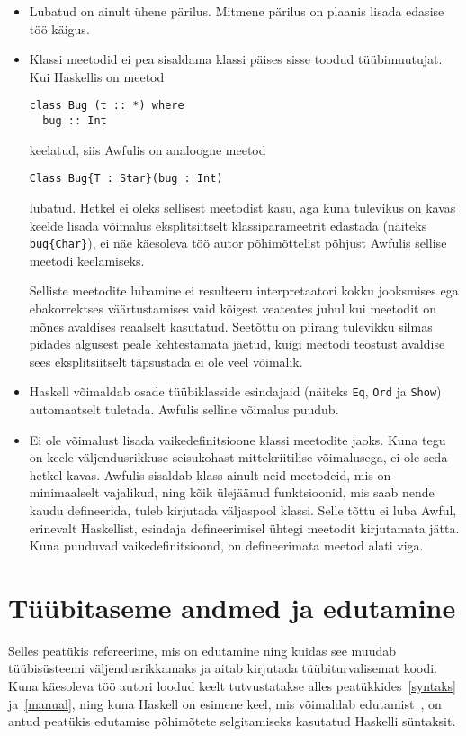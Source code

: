 \documentclass[12pt]{article}
\newcommand\peatykk[1]{
  \clearpage
  \section{#1}}
\begin{document}
      \begin{itemize}
        \item
          Lubatud on ainult ühene pärilus. Mitmene pärilus on plaanis lisada edasise töö käigus.
        \item
          Klassi meetodid ei pea sisaldama klassi päises sisse toodud tüübimuutujat. Kui Haskellis on meetod

          \begin{verbatim}class Bug (t :: *) where
  bug :: Int\end{verbatim}

          keelatud, siis Awfulis on analoogne meetod

          \begin{verbatim}Class Bug{T : Star}(bug : Int)\end{verbatim}

          lubatud. Hetkel ei oleks sellisest meetodist kasu, aga kuna tulevikus on kavas keelde lisada võimalus eksplitsiitselt klassiparameetrit edastada (näiteks \verb!bug{Char}!), ei näe käesoleva töö autor põhimõttelist põhjust Awfulis sellise meetodi keelamiseks.

          Selliste meetodite lubamine ei resulteeru interpretaatori kokku jooksmises ega ebakorrektses väärtustamises vaid kõigest veateates juhul kui meetodit on mõnes avaldises reaalselt kasutatud. Seetõttu on piirang tulevikku silmas pidades algusest peale kehtestamata jäetud, kuigi meetodi teostust avaldise sees eksplitsiitselt täpsustada ei ole veel võimalik.
        \item
          Haskell võimaldab osade tüübiklasside esindajaid (näiteks \verb!Eq!, \verb!Ord! ja \verb!Show!) automaatselt tuletada. Awfulis selline võimalus puudub.
        \item
          Ei ole võimalust lisada vaikedefinitsioone klassi meetodite jaoks. Kuna tegu on keele väljendusrikkuse seisukohast mittekriitilise võimalusega, ei ole seda hetkel kavas. Awfulis sisaldab klass ainult neid meetodeid, mis on minimaalselt vajalikud, ning kõik ülejäänud funktsioonid, mis saab nende kaudu defineerida, tuleb kirjutada väljaspool klassi. Selle tõttu ei luba Awful, erinevalt Haskellist, esindaja defineerimisel ühtegi meetodit kirjutamata jätta. Kuna puuduvad vaikedefinitsioond, on defineerimata meetod alati viga.
      \end{itemize}
  \peatykk{Tüübitaseme andmed ja edutamine}\label{edutamine}
    Selles peatükis refereerime, mis on edutamine ning kuidas see muudab tüübisüsteemi väljendusrikkamaks ja aitab kirjutada tüübiturvalisemat koodi. Kuna käesoleva töö autori loodud keelt tutvustatakse alles peatükkides~\ref{syntaks} ja~\ref{manual}, ning kuna Haskell on esimene keel, mis võimaldab edutamist~\cite{Giv}, on antud peatükis edutamise põhimõtete selgitamiseks kasutatud Haskelli süntaksit.
\end{document}
